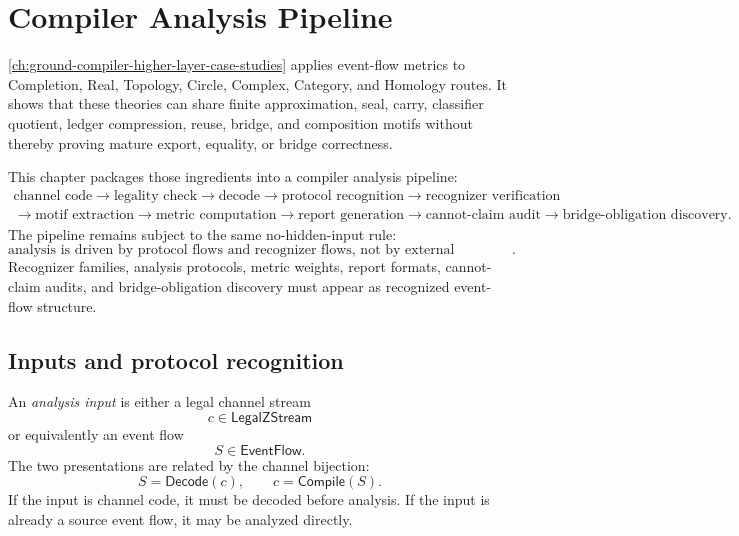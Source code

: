 \chapter{Compiler Analysis Pipeline}
\label{ch:ground-compiler-analysis-pipeline}

\autoref{ch:ground-compiler-higher-layer-case-studies} applies event-flow metrics to Completion, Real, Topology, Circle, Complex, Category, and Homology routes. It shows that these theories can share finite approximation, seal, carry, classifier quotient, ledger compression, reuse, bridge, and composition motifs without thereby proving mature export, equality, or bridge correctness.

This chapter packages those ingredients into a compiler analysis pipeline:
$$
\begin{gathered}
  \text{channel code}
  \longrightarrow
  \text{legality check}
  \longrightarrow
  \text{decode}
  \longrightarrow
  \text{protocol recognition}
  \longrightarrow
  \text{recognizer verification}\\
  \longrightarrow
  \text{motif extraction}
  \longrightarrow
  \text{metric computation}
  \longrightarrow
  \text{report generation}
  \longrightarrow
  \text{cannot-claim audit}
  \longrightarrow
  \text{bridge-obligation discovery}.
\end{gathered}
$$
The pipeline remains subject to the same no-hidden-input rule:
$$
  \boxed{\text{analysis is driven by protocol flows and recognizer flows, not by external configuration}.}
$$
Recognizer families, analysis protocols, metric weights, report formats, cannot-claim audits, and bridge-obligation discovery must appear as recognized event-flow structure.

\section{Inputs and protocol recognition}
\label{sec:analysis-pipeline-inputs-protocols}

\begin{definition}
\label{def:analysis-pipeline-input}
An \emph{analysis input} is either a legal channel stream
$$
  c\in\mathsf{LegalZStream}
$$
or equivalently an event flow
$$
  S\in\mathsf{EventFlow}.
$$
The two presentations are related by the channel bijection:
$$
  S=\mathsf{Decode}(c),
  \qquad
  c=\mathsf{Compile}(S).
$$
If the input is channel code, it must be decoded before analysis. If the input is already a source event flow, it may be analyzed directly.
\end{definition}

